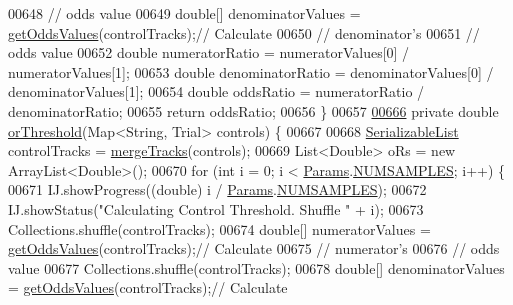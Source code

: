 \begin{DoxyCode}
{00648                                                               \textcolor{comment}{// odds value}
00649     \textcolor{keywordtype}{double}[] denominatorValues = \hyperlink{classanalysis_1_1_chemotaxis_a02c2fbfd2097bca3933e285e6712a58d}{getOddsValues}(controlTracks);\textcolor{comment}{// Calculate}
00650                                                               \textcolor{comment}{// denominator's}
00651                                                               \textcolor{comment}{// odds value}
00652     \textcolor{keywordtype}{double} numeratorRatio = numeratorValues[0] / numeratorValues[1];
00653     \textcolor{keywordtype}{double} denominatorRatio = denominatorValues[0] / denominatorValues[1];
00654     \textcolor{keywordtype}{double} oddsRatio = numeratorRatio / denominatorRatio;
00655     \textcolor{keywordflow}{return} oddsRatio;
00656   \}
00657 
\hypertarget{_chemotaxis_8java_source_l00666}{}\hyperlink{classanalysis_1_1_chemotaxis_a8ee54f019a9258760e20482e3cd6b851}{00666}   \textcolor{keyword}{private} \textcolor{keywordtype}{double} \hyperlink{classanalysis_1_1_chemotaxis_a8ee54f019a9258760e20482e3cd6b851}{orThreshold}(Map<String, Trial> controls) \{
00667 
00668     \hyperlink{classdata_1_1_serializable_list}{SerializableList} controlTracks = \hyperlink{classanalysis_1_1_chemotaxis_a226e01e0b4acab847ec3b2c1bb233740}{mergeTracks}(controls);
00669     List<Double> oRs = \textcolor{keyword}{new} ArrayList<Double>();
00670     \textcolor{keywordflow}{for} (\textcolor{keywordtype}{int} i = 0; i < \hyperlink{classdata_1_1_params}{Params}.\hyperlink{classdata_1_1_params_ae808f1c980157cfd070c6e09e587e2aa}{NUMSAMPLES}; i++) \{
00671       IJ.showProgress((\textcolor{keywordtype}{double}) i / \hyperlink{classdata_1_1_params}{Params}.\hyperlink{classdata_1_1_params_ae808f1c980157cfd070c6e09e587e2aa}{NUMSAMPLES});
00672       IJ.showStatus(\textcolor{stringliteral}{"Calculating Control Threshold. Shuffle "} + i);
00673       Collections.shuffle(controlTracks);
00674       \textcolor{keywordtype}{double}[] numeratorValues = \hyperlink{classanalysis_1_1_chemotaxis_a02c2fbfd2097bca3933e285e6712a58d}{getOddsValues}(controlTracks);\textcolor{comment}{// Calculate}
00675                                                               \textcolor{comment}{// numerator's}
00676                                                               \textcolor{comment}{// odds value}
00677       Collections.shuffle(controlTracks);
00678       \textcolor{keywordtype}{double}[] denominatorValues = \hyperlink{classanalysis_1_1_chemotaxis_a02c2fbfd2097bca3933e285e6712a58d}{getOddsValues}(controlTracks);\textcolor{comment}{// Calculate}
}
\end{DoxyCode}

